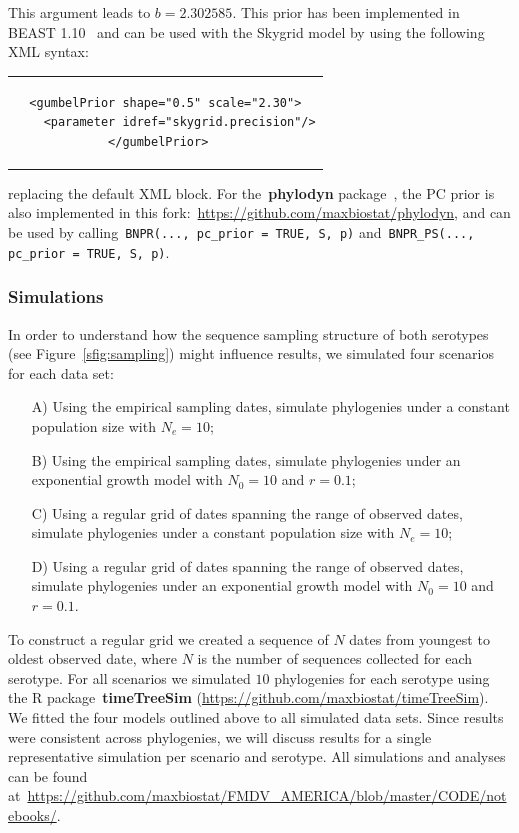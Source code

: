 \documentclass[a4paper,10pt]{article}
\begin{document}
This argument leads to $b = 2.302585$.
This prior has been implemented in BEAST 1.10~\citep{M-Suchard2018} and can be used with the Skygrid model by using the following XML syntax:
\lstset{language=XML}
\begin{center}
\begin{tabular}{c}
\begin{lstlisting}
<gumbelPrior shape="0.5" scale="2.30">
    <parameter idref="skygrid.precision"/>
</gumbelPrior>	
\end{lstlisting}
\end{tabular}
\end{center}
replacing the default XML block.
For the~\textbf{phylodyn} package~\citep{M-Karcher2017}, the PC prior is also implemented in this fork:~\url{https://github.com/maxbiostat/phylodyn}, and can be used by calling~\verb|BNPR(..., pc_prior = TRUE, S, p)| and~\verb|BNPR_PS(..., pc_prior = TRUE, S, p)|.

 
\subsubsection*{Simulations}

In order to understand how the sequence sampling structure of both serotypes (see Figure~\ref{sfig:sampling}) might influence results, we simulated four scenarios for each data set:
\begin{itemize}
 \item[A)] Using the empirical sampling dates, simulate phylogenies under a constant population size with $N_e = 10$;
 \item[B)] Using the empirical sampling dates, simulate phylogenies under an exponential growth model with $N_0 = 10$ and $r = 0.1$;
 \item[C)] Using a regular grid of dates spanning the range of observed dates, simulate phylogenies under a constant population size with $N_e = 10$; %
 \item[D)]  Using a regular grid of dates spanning the range of observed dates, simulate phylogenies under an exponential growth model with $N_0 = 10$ and $r = 0.1$.
\end{itemize}
To construct a regular grid we created a sequence of $N$ dates from youngest to oldest observed date, where $N$ is the number of sequences collected for each serotype.
For all scenarios we simulated $10$ phylogenies for each serotype using the R package~\textbf{timeTreeSim} (\url{https://github.com/maxbiostat/timeTreeSim}).
We fitted the four models outlined above to all simulated data sets.
Since results were consistent across phylogenies, we will discuss results for a single representative simulation per scenario and serotype.
All simulations and analyses can be found at~\url{https://github.com/maxbiostat/FMDV_AMERICA/blob/master/CODE/notebooks/}.
\end{document}
